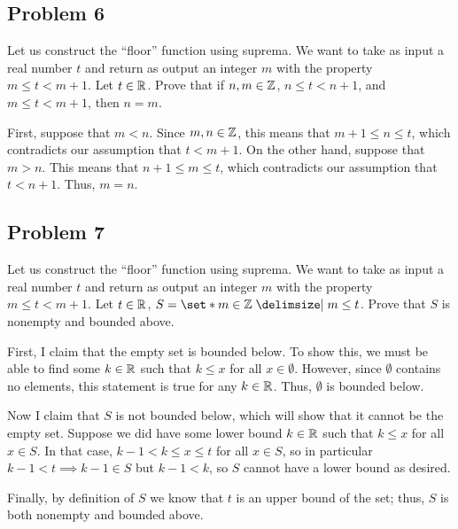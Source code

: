 \documentclass[main.tex]{subfiles}
\begin{document}
\subsection{Problem 6}
\begin{claim}
    Let us construct the “floor” function using suprema. We want to take as input a real number $t$ and return as output an integer $m$ with the property $m \le t < m + 1$. Let $t \in \mathbb R$. Prove that if $n, m \in \mathbb Z$, $n \le t < n + 1$, and $m \le t < m + 1$, then $n = m$.
\end{claim}

\begin{soln}
    First, suppose that $m < n$. Since $m, n\in \mathbb Z$, this means that $m + 1\le n\le t$, which contradicts our assumption that $t < m + 1$. On the other hand, suppose that $m > n$. This means that $n + 1\le m\le t$, which contradicts our assumption that $t < n + 1$. Thus, $m = n$.
\end{soln}
\eject

\subsection{Problem 7}
\begin{claim}
    Let us construct the “floor” function using suprema. We want to take as input a real number $t$ and return as output an integer $m$ with the property $m \le t < m + 1$. Let $t \in \mathbb R$, $S = \set*{m \in \ZZ \mid m \le t}$. Prove that $S$ is nonempty and bounded above.
\end{claim}

\begin{soln}
    First, I claim that the empty set is bounded below. To show this, we must be able to find some $k\in \mathbb R$ such that $k\le x$ for all $x\in \emptyset$. However, since $\emptyset$ contains no elements, this statement is true for any $k\in \mathbb R$. Thus, $\emptyset$ is bounded below.
    
    Now I claim that $S$ is not bounded below, which will show that it cannot be the empty set. Suppose we did have some lower bound $k\in \mathbb R$ such that $k\le x$ for all $x\in S$. In that case, $k - 1 < k \le x \le t$ for all $x\in S$, so in particular $k - 1 < t\implies k - 1 \in S$ but $k - 1 < k$, so $S$ cannot have a lower bound as desired.
    
    Finally, by definition of $S$ we know that $t$ is an upper bound of the set; thus, $S$ is both nonempty and bounded above.
\end{soln}
\eject
\end{document}
